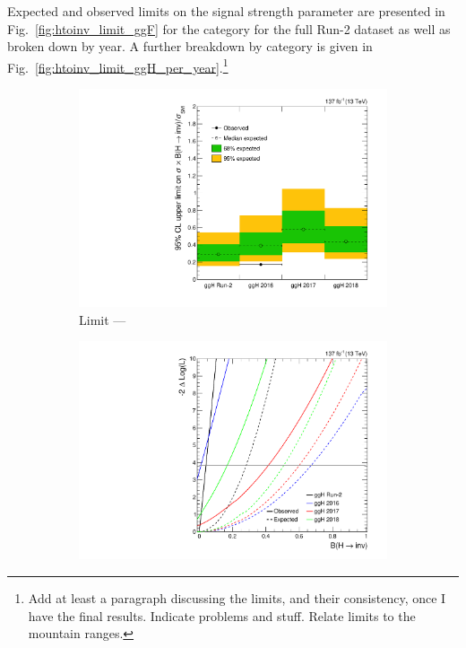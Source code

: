 Expected and observed limits on the signal strength parameter are presented in Fig.~\ref{fig:htoinv_limit_ggF} for the \ggH category for the full Run-2 dataset as well as broken down by year. A further breakdown by category is given in Fig.~\ref{fig:htoinv_limit_ggH_per_year}.\footnote{Add at least a paragraph discussing the limits, and their consistency, once I have the final results. Indicate problems and stuff. Relate limits to the mountain ranges.}

\begin{figure}[htbp]
    \centering
    \begin{subfigure}[b]{0.45\textwidth}
        \includegraphics[width=\textwidth]{figures/limits/ggF/limit_Run2_ggF.pdf}
        \caption{Limit --- \ggH}
    \end{subfigure}
    \hspace{0.05\textwidth}
    \begin{subfigure}[t]{0.45\textwidth}
        \includegraphics[width=\textwidth]{figures/likelihood_scan/profile_likelihood_scan_Run2_ggF.pdf}

\end{subfigure}
\end{figure}
